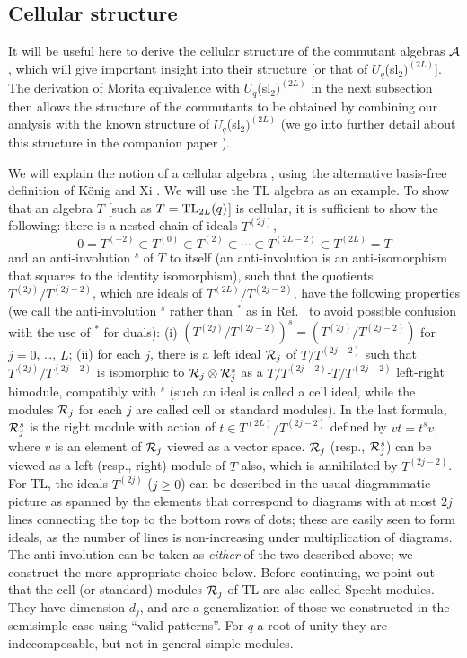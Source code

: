 \documentclass[twocolumn,floats,pra]{revtex4}
\def \cA {{\cal A}}
\newcommand {\be}{\begin{equation}}
\newcommand {\ee} {\end{equation}}
\begin{document}
\subsection{Cellular structure}



It will be useful here to derive the cellular structure of the
commutant algebras $\cA$, which will give important insight into
their structure [or that of $U_q$(sl$_2)^{(2L)}$]. The derivation
of Morita equivalence with $U_q$(sl$_2)^{(2L)}$ in the next
subsection then allows the structure of the commutants to be
obtained by combining our analysis with the known structure of
$U_q$(sl$_2)^{(2L)}$ (we go into further detail about this
structure in the companion paper \cite{rs3}).

We will explain the notion of a cellular algebra \cite{gl}, using
the alternative basis-free definition of K\"onig and Xi
\cite{kx,mathas}. We will use the TL algebra as an example. To
show that an algebra $T$ [such as $T ={\rm TL}_{2L}(q)$] is
cellular, it is sufficient \cite{kx} to show the following: there
is a nested chain of ideals
$T^{(2j)}$,%
\be%
0=T^{(-2)}\subset T^{(0)}\subset T^{(2)}\subset \cdots \subset
T^{(2L-2)}\subset
T^{(2L)}=T\ee%
and an anti-involution $^s$ of $T$ to itself (an anti-involution
is an anti-isomorphism that squares to the identity isomorphism),
such that the quotients $T^{(2j)}/T^{(2j-2)}$, which are ideals of
$T^{(2L)}/T^{(2j-2)}$, have the following properties (we call the
anti-involution $^s$ rather than $^*$ as in Ref.\ \cite{gl} to
avoid possible confusion with the use of $^*$ for duals): (i)
$(T^{(2j)}/T^{(2j-2)})^s=(T^{(2j)}/T^{(2j-2)})$ for $j=0$, \ldots,
$L$; (ii) for each $j$, there is a left ideal ${\cal R}_j$ of
$T/T^{(2j-2)}$ such that $T^{(2j)}/T^{(2j-2)}$ is isomorphic to
${\cal R}_j\otimes {\cal R}_j^s$ as a
$T/T^{(2j-2)}$-$T/T^{(2j-2)}$ left-right bimodule, compatibly with
$^s$ (such an ideal is called a cell ideal, while the modules
${\cal R}_j$ for each $j$ are called cell or standard modules). In
the last formula, ${\cal R}_j^s$ is the right module with action
of $t\in T^{(2L)}/T^{(2j-2)}$ defined by $vt=t^sv$, where $v$ is
an element of ${\cal R}_j$ viewed as a vector space. ${\cal R}_j$
(resp., ${\cal R}_j^s$) can be viewed as a left (resp., right)
module of $T$ also, which is annihilated by $T^{(2j-2)}$. For TL,
the ideals $T^{(2j)}$ ($j\geq0$) can be described in the usual
diagrammatic picture as spanned by the elements that correspond to
diagrams with at most $2j$ lines connecting the top to the bottom
rows of dots; these are easily seen to form ideals, as the number
of lines is non-increasing under multiplication of diagrams. The
anti-involution can be taken as {\em either} of the two described
above; we construct the more appropriate choice below. Before
continuing, we point out that the cell (or standard) modules
${\cal R}_j$ of TL are also called Specht modules. They have
dimension $d_j$, and are a generalization of those we constructed
in the semisimple case using ``valid patterns''. For $q$ a root of
unity they are indecomposable, but not in general simple modules.
\end{document}
